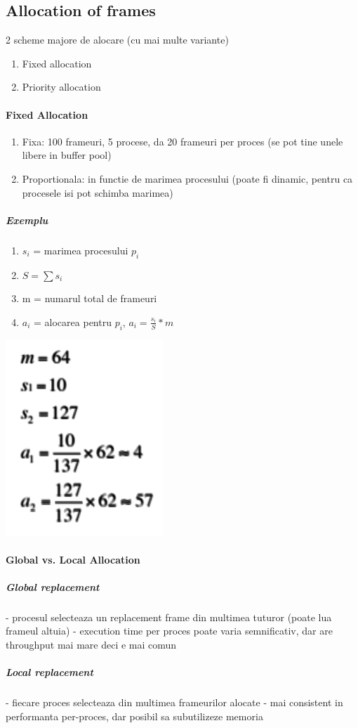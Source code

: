 \documentclass{article}
\begin{document}
\subsection*{Allocation of frames}
2 scheme majore de alocare (cu mai multe variante)
\begin{enumerate}
    \item Fixed allocation
    \item Priority allocation
\end{enumerate}

\paragraph*{Fixed Allocation}
\begin{enumerate}
    \item Fixa: 100 frameuri, 5 procese, da 20 frameuri per proces (se pot tine unele libere in buffer pool)
    \item Proportionala: in functie de marimea procesului (poate fi dinamic, pentru ca procesele isi pot schimba marimea)
\end{enumerate}
\subparagraph*{Exemplu}
\begin{enumerate}
    \item $s_i$ = marimea procesului $p_i$
    \item $S = \sum s_i$
    \item m = numarul total de frameuri
    \item $a_i$ = alocarea pentru $p_i$, $a_i = \frac{s_i}{S}*m$
\end{enumerate}
\begin{center}
    \includegraphics[scale=0.4]{37-fixedalloc.png}
\end{center}

\paragraph*{Global vs. Local Allocation}
\subparagraph*{Global replacement} - procesul selecteaza un replacement frame din multimea tuturor (poate lua frameul altuia) - execution time per proces poate varia semnificativ, dar are throughput mai mare deci e mai comun
\subparagraph*{Local replacement} - fiecare proces selecteaza din multimea frameurilor alocate - mai consistent in performanta per-proces, dar posibil sa subutilizeze memoria
\end{document}

